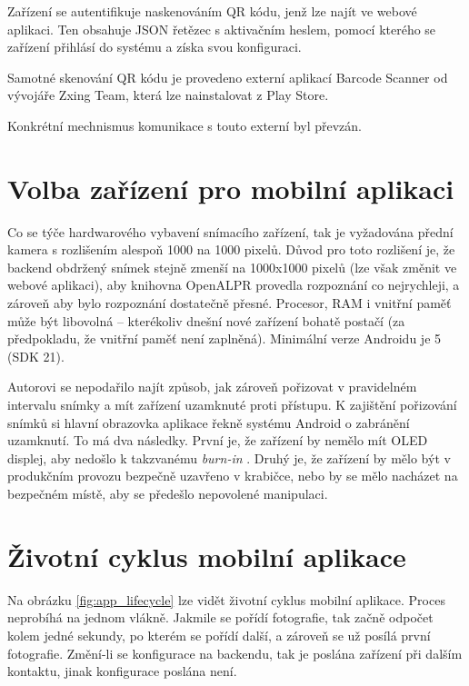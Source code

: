 \noindent
Zařízení se autentifikuje naskenováním QR kódu, jenž lze najít ve webové aplikaci. Ten obsahuje
JSON řetězec s aktivačním heslem, pomocí kterého se zařízení přihlásí do systému a získa svou konfiguraci.

Samotné skenování QR kódu je provedeno externí aplikací Barcode Scanner od vývojáře
Zxing Team, která lze nainstalovat z Play Store.

Konkrétní mechnismus komunikace s touto externí byl převzán. \citep[viz][]{QrScan}

\section{Volba zařízení pro mobilní aplikaci}

\noindent
Co se týče hardwarového vybavení snímacího zařízení, tak je vyžadována přední kamera
s rozlišením alespoň 1000 na 1000 pixelů. Důvod pro toto rozlišení je, že backend obdržený snímek
stejně zmenší na 1000x1000 pixelů (lze však změnit ve webové aplikaci), aby knihovna OpenALPR provedla rozpoznání co nejrychleji, a zároveň
aby bylo rozpoznání dostatečně přesné. Procesor, RAM i vnitřní paměť může být libovolná -- kterékoliv
dnešní nové zařízení bohatě postačí (za předpokladu, že vnitřní paměť není zaplněná).
Minimální verze Androidu je 5 (SDK 21).

Autorovi se nepodařilo najít způsob, jak zároveň pořizovat v pravidelném intervalu snímky
a mít zařízení uzamknuté proti přístupu. K zajištění pořizování snímků si hlavní
obrazovka aplikace řekně systému Android o zabránění uzamknutí.
To má dva následky. První je, že zařízení by nemělo mít OLED displej, aby nedošlo k takzvanému
\textit{burn-in} \citep[viz][]{OledBurnIn}. Druhý je, že zařízení by mělo být v produkčním provozu
bezpečně uzavřeno v krabičce, nebo by se mělo nacházet na bezpečném místě, aby se předešlo
nepovolené manipulaci.

\section{Životní cyklus mobilní aplikace}

\noindent
Na obrázku \ref{fig:app_lifecycle} lze vidět životní cyklus mobilní aplikace.
Proces neprobíhá na jednom vlákně. Jakmile se pořídí fotografie, tak začně odpočet kolem jedné
sekundy, po kterém se pořídí další, a zároveň se už posílá první fotografie.
Změní-li se konfigurace na backendu, tak je poslána zařízení při dalším kontaktu, jinak
konfigurace poslána není.

